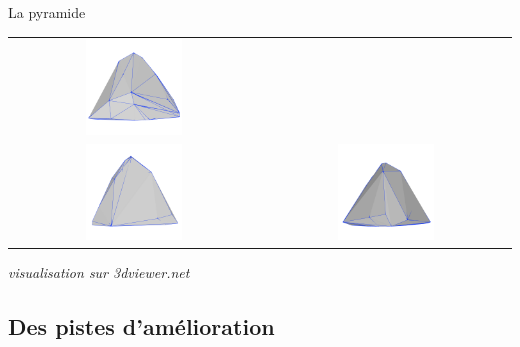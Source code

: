 \begin{frame}{La pyramide}
\begin{minipage}{0.60\textwidth}
\begin{tabular}{cc}
        \includegraphics[width=0.40\textwidth]{capture/face2.png} \\
        \includegraphics[width=0.40\textwidth]{capture/face3.png} &
        \includegraphics[width=0.40\textwidth]{capture/profil.png} \\
    \end{tabular}
    \vspace{0.2em}

    {\tiny \textit{visualisation sur 3dviewer.net}}
\end{minipage}
\end{frame}

\subsection{Des pistes d'amélioration}


